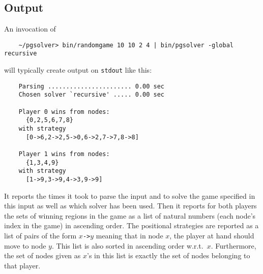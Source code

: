 


\subsection{Output}

An invocation of
\begin{verbatim}
    ~/pgsolver> bin/randomgame 10 10 2 4 | bin/pgsolver -global recursive
\end{verbatim}
will typically create output on \texttt{stdout} like this:
\begin{verbatim}
    Parsing ....................... 0.00 sec
    Chosen solver `recursive' ..... 0.00 sec

    Player 0 wins from nodes:
      {0,2,5,6,7,8}
    with strategy
      [0->6,2->2,5->0,6->2,7->7,8->8]

    Player 1 wins from nodes:
      {1,3,4,9}
    with strategy
      [1->9,3->9,4->3,9->9]
\end{verbatim}
It reports the times it took to parse the input and to solve the game specified in this input
as well as which solver has been used. Then it reports for both players the sets of winning
regions in the game as a list of natural numbers (each node's index in the game) in ascending order.
The positional strategies are reported as a list of pairs of the form $x$\texttt{->}$y$ meaning
that in node $x$, the player at hand should move to node $y$. This list is also sorted in
ascending order w.r.t.\ $x$. Furthermore, the set of nodes given as $x$'s in this list is
exactly the set of nodes belonging to that player.




